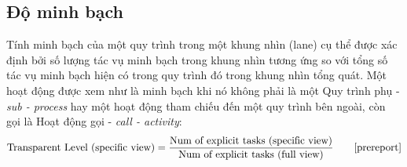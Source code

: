 \subsection{Độ minh bạch}
Tính minh bạch của một quy trình trong một khung nhìn (lane) cụ thể được xác định bởi số lượng tác vụ minh bạch trong khung nhìn tương ứng so với tổng số tác vụ minh bạch hiện có trong quy trình đó trong khung nhìn tổng quát. Một hoạt động được xem như là minh bạch khi nó không phải là một Quy trình phụ - \emph{sub - process} hay một hoạt động tham chiếu đến một quy trình bên ngoài, còn gọi là Hoạt động gọi - \emph{call - activity}:
\[ \text{Transparent Level (specific view)}  = \frac{\text{Num of explicit tasks (specific view)} }{\text{Num of explicit tasks (full view)}} \tag*{\cite{prereport}}\]
